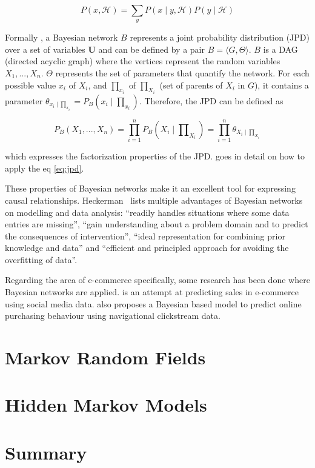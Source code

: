 \begin{equation}
P(x, \mathcal{H}) = \sum_{y}^{} P(x \mid y, \mathcal{H}) P(y \mid \mathcal{H}) \label{eq:sum}
\end{equation}

Formally \cite{Pearl:1988:PRI:534975}, a Bayesian network $ B $ represents a joint probability distribution (JPD) over a set of variables $ \mathbf{U}$ and can be defined by a pair $ B = \langle G, \Theta \rangle $. $ B $ is a DAG (directed acyclic graph) where the vertices represent the random variables $ X_{1}, ..., X_{n} $. $ \Theta $ represents the set of parameters that quantify the network. For each possible value $ x_{i} $ of $ X_{i} $, and $ \prod_{x_{i}} $ of $ \prod_{X_{i}} $ (set of parents of $ X_{i} $ in $ G $), it contains a parameter $ \theta_{x_{i} \mid \prod_{x_{i}}} = P_{B}(x_{i} \mid \prod_{x_{i}}) $. Therefore, the JPD can be defined as

\begin{equation}
P_{B}(X_{1}, ..., X_{n}) = \prod_{i=1}^{n} P_{B}(X_{i} \mid \prod\nolimits_{X_{i}}) =
\prod_{i=1}^{n} \theta_{X_{i} \mid \prod_{X_{i}}} \label{eq:jpd}
\end{equation}

which expresses the factorization properties of the JPD. \cite[section 8.1.]{bishop2006pattern} goes in detail on how to apply the eq \ref{eq:jpd}.

These properties of Bayesian networks make it an excellent tool for expressing causal relationships. Heckerman~\cite{Heckerman1996} lists multiple advantages of Bayesian networks on modelling and data analysis: ``readily handles situations where some data entries are missing'', ``gain understanding about a problem domain and to predict the consequences of intervention'', ``ideal representation for combining prior knowledge and data'' and ``efficient and principled approach for avoiding the overfitting of data''.

Regarding the area of e-commerce specifically, some research has been done where Bayesian networks are applied. \cite{Nasambu2014} is an attempt at predicting sales in e-commerce using social media data. \cite{Moe2002} also proposes a Bayesian based model to predict online purchasing behaviour using navigational clickstream data.

\section{Markov Random Fields}

\section{Hidden Markov Models}

\cite{Rabiner1989}

\section{Summary}
